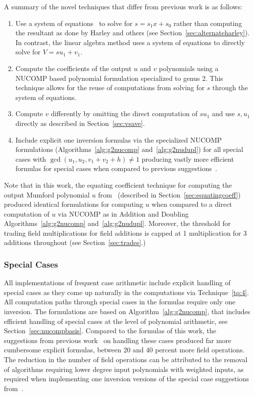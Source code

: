 A summary of the novel techniques that differ from previous work is as follows:
\begin{enumerate}[label=T\arabic*]
\item \label{tq:1} 
Use a system of equations~\cite{Balamohan_MSc_2009,CostelloLauter_geo_2011} to
solve for $s=s_1x + s_0$ rather than computing the resultant as done by Harley
and others (see Section~\ref{sec:alternateharley}). In contrast, the linear
algebra method uses a system of equations to directly solve for $V = su_1 + v_1$.
\item \label{tq:2} 
Compute the coefficients of the output $u$ and $v$ polynomials using a NUCOMP
based polynomial formulation specialized to genus 2. This technique allows for
the reuse of computations from solving for $s$ through the system of equations.
\item \label{tq:3} 
Compute $v$ differently by omitting the direct computation of $su_1$ and use
$s,u_1$ directly as described in Section~\ref{sec:vsave}.
\item \label{tq:4} Include explicit one inversion formulas via the specialized
NUCOMP formulations (Algorithms~\ref{alg:g2nucomp} and~\ref{alg:g2nudupl})
for all special cases with $\gcd (u_1,u_2,v_1 + v_2 + h) \not = 1$ producing
vastly more efficient formulas for special cases when compared to previous
suggestions~\cite{Lange_explicit_2005}.
\end{enumerate}

Note that in this work, the equating coefficient technique for computing the
output Mumford polynomial $u$ from~\cite{CostelloLauter_geo_2011} (described in
Section~\ref{sec:equatingcoeff}) produced identical formulations for computing
$u$ when compared to a direct computation of $u$ via NUCOMP as in Addition and
Doubling Algorithms~\ref{alg:g2nucomp} and~\ref{alg:g2nudupl}. Moreover, the
threshold for trading field multiplications for field additions is capped at 1
multiplication for 3 additions throughout (see Section~\ref{sec:trades}.)

\subsubsection{Special Cases}
All implementations of frequent case arithmetic include explicit handling of
special cases as they come up naturally in the computations via
Technique~\ref{tq:4}. All computation paths through special cases in the
formulas require only one inversion. The formulations are based on
Algorithm~\ref{alg:g2nucomp}, that includes efficient handling of special cases
at the level of polynomial arithmetic, see Section~\ref{sec:nucompbasis}.
Compared to the formulas of this work, the suggestions from previous
work~\cite{Lange_explicit_2005} on handling these cases produced far more
cumbersome explicit formulas, between 20 and 40 percent more field
operations. The reduction in the number of field operations can be
attributed to the removal of algorithms requiring lower degree input polynomials with weighted
inputs, as required when implementing one inversion versions of the special case
suggestions from~\cite{Lange_explicit_2005}. 


